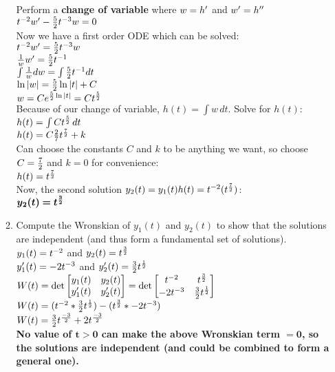 \documentclass{article}
\begin{document}
\begin{enumerate}
\begin{enumerate}
Perform a \textbf{change of variable} where $w = h\sp\prime$ and $w\sp\prime = h\sp{\prime\prime}$\\
$ t\sp{-2}w\sp{\prime} - {5\over2}t\sp{-3}w =0$\\
Now we have a first order ODE which can be solved:\\
$ t\sp{-2}w\sp{\prime} = {5\over2}t\sp{-3}w $\\
$ {1\over w}w\sp{\prime} = {5\over2}t\sp{-1} $\\
$ \int{{1\over w}dw} = \int{{5\over2}t\sp{-1}dt} $\\
$ \ln|w| = {5\over2}\ln|t|+C $\\
$ w = Ce\sp{{5\over2}\ln|t|} = Ct\sp{5\over2} $\\
Because of our change of variable, $h(t) = \int{w\,dt}$. Solve for $h(t)$:\\
$h(t) = \int{Ct\sp{5\over2}\,dt}$\\
$h(t) = C{2\over7}t\sp{7\over2}+k$\\
Can choose the constants $C$ and $k$ to be anything we want, so choose $C={7\over2}$ and $k=0$ for convenience:\\
$h(t) = t\sp{7\over2}$\\

Now, the second solution $y_2(t) = y_1(t)h(t) = t\sp{-2}(t\sp{7\over2})$:\\
$\bm{y_2(t) = t\sp{3\over2}}$\\

\item
Compute the Wronskian of $y_1(t)$ and $y_2(t)$ to show that the solutions are independent (and thus form a fundamental set of solutions).\\

$y_1(t) = t\sp{-2}$ and $y_2(t) = t\sp{3\over2}$\\
$y_1\sp\prime(t) = -2t\sp{-3}$ and $y_2\sp\prime(t) = {3\over2}t\sp{1\over2}$\\

$W(t)=\det\begin{bmatrix}y_1(t) & y_2(t) \\ y_1\sp\prime(t) & y_2\sp\prime(t)\end{bmatrix} = \det\begin{bmatrix}t\sp{-2} & t\sp{3\over2} \\ -2t\sp{-3} & {3\over2}t\sp{1\over2}\end{bmatrix}$\\
$W(t)=(t\sp{-2}*{3\over2}t\sp{1\over2}) - (t\sp{3\over2}*-2t\sp{-3})$\\
$W(t)={3\over2}t\sp{-3\over2} + 2t\sp{-3\over2}$\\
\textbf{No value of $\bm{t>0}$ can make the above Wronskian term $\bm{= 0}$, so the solutions are independent (and could be combined to form a general one).}\\


\end{enumerate}
\end{enumerate}
\end{document}
